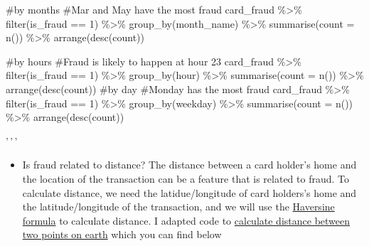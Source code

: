 \documentclass[
]{article}
\providecommand{\tightlist}{%
  \setlength{\itemsep}{0pt}\setlength{\parskip}{0pt}}
\begin{document}
\#by months \#Mar and May have the most fraud card\_fraud
\%\textgreater\% filter(is\_fraud == 1) \%\textgreater\%
group\_by(month\_name) \%\textgreater\% summarise(count = n())
\%\textgreater\% arrange(desc(count))

\#by hours \#Fraud is likely to happen at hour 23 card\_fraud
\%\textgreater\% filter(is\_fraud == 1) \%\textgreater\% group\_by(hour)
\%\textgreater\% summarise(count = n()) \%\textgreater\%
arrange(desc(count)) \#by day \#Monday has the most fraud card\_fraud
\%\textgreater\% filter(is\_fraud == 1) \%\textgreater\%
group\_by(weekday) \%\textgreater\% summarise(count = n())
\%\textgreater\% arrange(desc(count))

'\,'\,'

\begin{itemize}
\tightlist
\item
  Is fraud related to distance? The distance between a card holder's
  home and the location of the transaction can be a feature that is
  related to fraud. To calculate distance, we need the latidue/longitude
  of card holders's home and the latitude/longitude of the transaction,
  and we will use the
  \href{https://en.wikipedia.org/wiki/Haversine_formula}{Haversine
  formula} to calculate distance. I adapted code to
  \href{https://www.geeksforgeeks.org/program-distance-two-points-earth/amp/}{calculate
  distance between two points on earth} which you can find below
\end{itemize}
\end{document}
